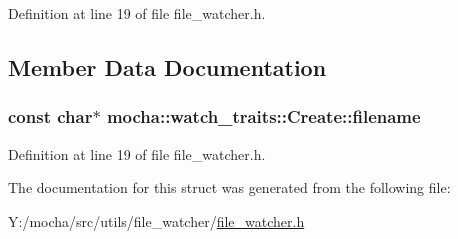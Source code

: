 Definition at line 19 of file file\_\-watcher.h.



\subsection{Member Data Documentation}
\hypertarget{structmocha_1_1watch__traits_1_1_create_a230e9cae2915ef8cd40f013a0277d008}{
\subsubsection[{filename}]{\setlength{\rightskip}{0pt plus 5cm}const char$\ast$ {\bf mocha::watch\_\-traits::Create::filename}}}
\label{structmocha_1_1watch__traits_1_1_create_a230e9cae2915ef8cd40f013a0277d008}


Definition at line 19 of file file\_\-watcher.h.



The documentation for this struct was generated from the following file:\begin{DoxyCompactItemize}
\item 
Y:/mocha/src/utils/file\_\-watcher/\hyperlink{file__watcher_8h}{file\_\-watcher.h}\end{DoxyCompactItemize}
